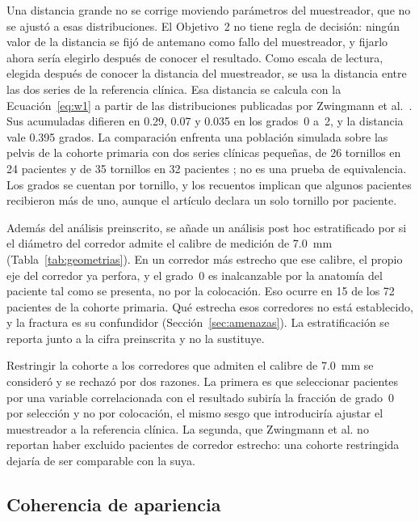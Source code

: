 Una distancia grande no se corrige moviendo parámetros del muestreador, que no se ajustó a esas distribuciones. El Objetivo~2 no tiene regla de decisión: ningún valor de la distancia se fijó de antemano como fallo del muestreador, y fijarlo ahora sería elegirlo después de conocer el resultado. Como escala de lectura, elegida después de conocer la distancia del muestreador, se usa la distancia entre las dos series de la referencia clínica. Esa distancia se calcula con la Ecuación~\eqref{eq:w1} a partir de las distribuciones publicadas por Zwingmann et al.~\cite{zwingmann2009navigated}. Sus acumuladas difieren en 0.29, 0.07 y 0.035 en los grados~0 a~2, y la distancia vale 0.395 grados. La comparación enfrenta una población simulada sobre las pelvis de la cohorte primaria con dos series clínicas pequeñas, de 26 tornillos en 24 pacientes y de 35 tornillos en 32 pacientes \cite{zwingmann2009navigated}; no es una prueba de equivalencia. Los grados se cuentan por tornillo, y los recuentos implican que algunos pacientes recibieron más de uno, aunque el artículo declara un solo tornillo por paciente.

Además del análisis preinscrito, se añade un análisis post hoc estratificado por si el diámetro del corredor admite el calibre de medición de 7.0~mm (Tabla~\ref{tab:geometrias}). En un corredor más estrecho que ese calibre, el propio eje del corredor ya perfora, y el grado~0 es inalcanzable por la anatomía del paciente tal como se presenta, no por la colocación. Eso ocurre en 15 de los 72 pacientes de la cohorte primaria. Qué estrecha esos corredores no está establecido, y la fractura es su confundidor (Sección~\ref{sec:amenazas}). La estratificación se reporta junto a la cifra preinscrita y no la sustituye.

Restringir la cohorte a los corredores que admiten el calibre de 7.0~mm se consideró y se rechazó por dos razones. La primera es que seleccionar pacientes por una variable correlacionada con el resultado subiría la fracción de grado~0 por selección y no por colocación, el mismo sesgo que introduciría ajustar el muestreador a la referencia clínica. La segunda, que Zwingmann et al. no reportan haber excluido pacientes de corredor estrecho: una cohorte restringida dejaría de ser comparable con la suya.

\subsection{Coherencia de apariencia}\label{sec:apariencia}

